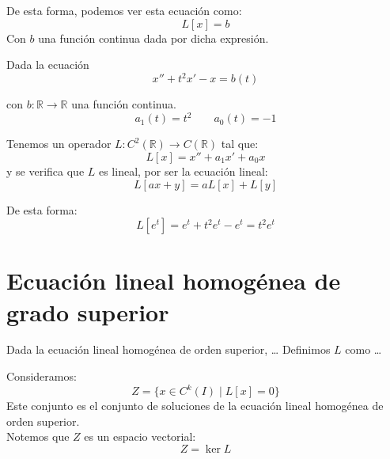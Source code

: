De esta forma, podemos ver esta ecuación como:
\begin{equation*}
    L[x] = b
\end{equation*}
Con $b$ una función continua dada por dicha expresión.

\begin{ejemplo}
    Dada la ecuación
    \begin{equation*}
        x'' + t^2 x' - x = b(t)
    \end{equation*}

    con $b:\mathbb{R}\rightarrow\mathbb{R}$ una función continua.\\
    \begin{equation*}
        a_1(t) = t^2 \qquad a_0(t) = -1
    \end{equation*}

    Tenemos un operador $L:C^2(\mathbb{R})\rightarrow C(\mathbb{R})$ tal que:
    \begin{equation*}
        L[x] = x'' + a_1 x' + a_0 x
    \end{equation*}
    y se verifica que $L$ es lineal, por ser la ecuación lineal:
    \begin{equation*}
        L[ax+y] = aL[x] + L[y]
    \end{equation*}

    De esta forma:
    \begin{equation*}
        L[e^t] = e^t + t^2 e^t - e^t = t^2 e^t
    \end{equation*}
\end{ejemplo}

\section{Ecuación lineal homogénea de grado superior}
Dada la ecuación lineal homogénea de orden superior, \ldots
Definimos $L$ como \ldots

Consideramos: 
\begin{equation*}
    Z = \{x \in C^k(I) \mid L[x] = 0\}
\end{equation*}
Este conjunto es el conjunto de soluciones de la ecuación lineal homogénea de orden superior.\\

Notemos que $Z$ es un espacio vectorial:
\begin{equation*}
    Z = \ker L
\end{equation*}

